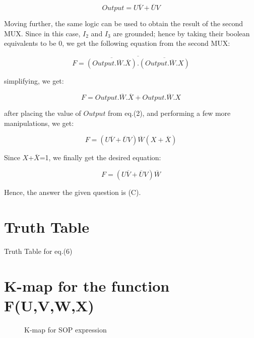 \documentclass{article}
\begin{document}
\begin{equation}
    Output = U \overline{V} + \overline{U} V
\end{equation}

Moving further, the same logic can be used to obtain the result of the second MUX. Since in this case, $I_2$ and $I_3$ are grounded; hence by taking their boolean equivalents to be 0, we get the following equation from the second MUX:

\begin{equation}
    F = \overline{ \overline{(Output. \overline{W}. \overline{X})}. \overline{(Output. \overline{W}. X )}}
\end{equation}

simplifying, we get:

\begin{equation}
    F = Output.\overline{W}.\overline{X} + Output.\overline{W}.X
\end{equation}

after placing the value of $Output$ from eq.(2), and performing a few more manipulations, we get:

\begin{equation}
    F = (U\overline{V}+\overline{U}V)\overline{W}(X+\overline{X})
\end{equation}

Since $X$+$\overline{X}$=1, we finally get the desired equation:

\begin{equation}
    F = (U\overline{V}+\overline{U}V)\overline{W}
\end{equation}

Hence, the answer the given question is (C).

\section{Truth Table}
\begin{table}[!h]
\centering
\scalebox{1.6}{

}
\caption{Truth Table for eq.(6)}
\label{table1}
\end{table}

\section{K-map for the function F(U,V,W,X)}
\hspace{2cm}
\begin{figure}[h]
\centering

\caption{K-map for SOP expression}
\label{kmap_SOP}
\end{figure}
\end{document}
